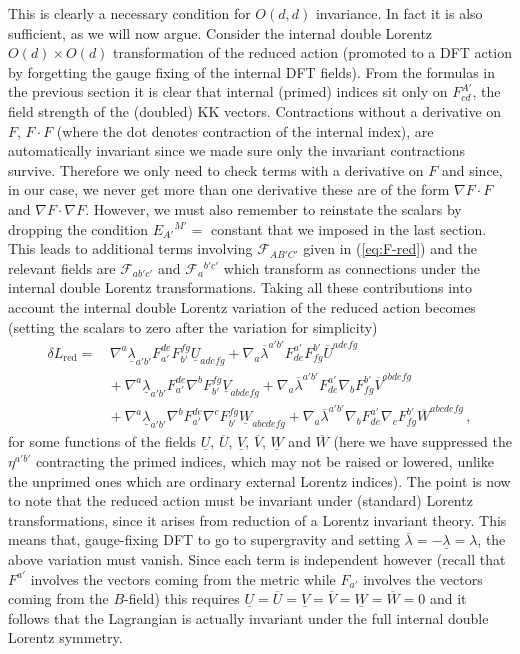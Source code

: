 \documentclass[a4paper,11pt]{article}
\renewcommand{\o}{\overline}
\renewcommand{\u}{\underline}
\begin{document}
{This is clearly a necessary condition for $O(d,d)$ invariance. In fact it is also sufficient, as we will now argue. Consider the internal double Lorentz $O(d)\times O(d)$ transformation of the reduced action (promoted to a DFT action by forgetting the gauge fixing of the internal DFT fields). From the formulas in the previous section it is clear that internal (primed) indices sit only on $F^{A'}_{cd}$, the field strength of the (doubled) KK vectors. Contractions without a derivative on $F$, $F\cdot F$ (where the dot denotes contraction of the internal index), are automatically invariant since we made sure only the invariant contractions survive. Therefore we only need to check terms with a derivative on $F$ and since, in our case, we never get more than one derivative these are of the form $\nabla F\cdot F$ and $\nabla F\cdot\nabla F$. However, we must also remember to reinstate the scalars by dropping the condition $E_{A'}{}^{M'}=$ constant that we imposed in the last section. This leads to additional terms involving $\mathcal F_{AB'C'}$ given in (\ref{eq:F-red}) and the relevant fields are $\mathcal F_{ab'c'}$ and $\mathcal F_a{}^{b'c'}$ which transform as connections under the internal double Lorentz transformations. Taking all these contributions into account the internal double Lorentz variation of the reduced action becomes (setting the scalars to zero after the variation for simplicity)
\begin{equation}
\begin{aligned}
\delta L_{\mathrm{red}}=&\,{}\nabla^a\u\lambda_{a'b'}F_{a'}^{de}F_{b'}^{fg}\u U_{adefg}
+\nabla_a\o\lambda^{a'b'}F^{a'}_{de}F^{b'}_{fg}\o U^{adefg}
\\
&{}
+\nabla^a\u\lambda_{a'b'}F_{a'}^{de}\nabla^bF_{b'}^{fg}\u V_{abdefg}
+\nabla_a\o\lambda^{a'b'}F^{a'}_{de}\nabla_bF^{b'}_{fg}\o V^{abdefg}
\\
&{}
+\nabla^a\u\lambda_{a'b'}\nabla^bF_{a'}^{de}\nabla^cF_{b'}^{fg}\u W_{abcdefg}
+\nabla_a\o\lambda^{a'b'}\nabla_bF^{a'}_{de}\nabla_cF^{b'}_{fg}\o W^{abcdefg}\,,
\end{aligned}
\end{equation}
for some functions of the fields $\u U$, $\o U$, $\u V$, $\o V$, $\u W$ and $\o W$ (here we have suppressed the $\eta^{a'b'}$ contracting the primed indices, which may not be raised or lowered, unlike the unprimed ones which are ordinary external Lorentz indices). The point is now to note that the reduced action must be invariant under (standard) Lorentz transformations, since it arises from reduction of a Lorentz invariant theory. This means that, gauge-fixing DFT to go to supergravity and setting $\o\lambda=-\u\lambda=\lambda$, the above variation must vanish. Since each term is independent however (recall that $F^{a'}$ involves the vectors coming from the metric while $F_{a'}$ involves the vectors coming from the $B$-field) this requires $\u U=\o U=\u V=\o V=\u W=\o W=0$ and it follows that the Lagrangian is actually invariant under the full internal double Lorentz symmetry.
}
\end{document}
